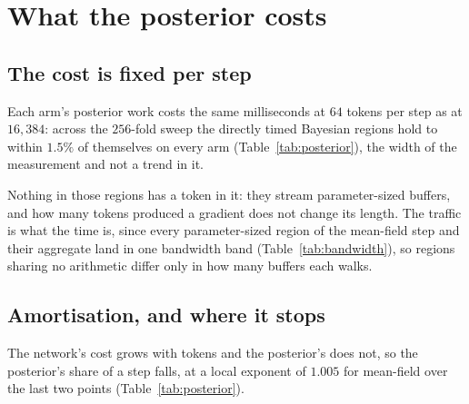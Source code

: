 \section{What the posterior costs}
\label{sec:cost}


\subsection{The cost is fixed per step}
\label{sec:cost:flat}

Each arm's posterior work costs the same milliseconds at $64$ tokens per step as at
$16{,}384$: across the $256$-fold sweep the directly timed Bayesian regions hold to
within $1.5\%$ of themselves on every arm (Table~\ref{tab:posterior}), the width of
the measurement and not a trend in it.

Nothing in those regions has a token in it: they stream parameter-sized buffers, and
how many tokens produced a gradient does not change its length. The traffic
is what the time is, since every parameter-sized region of the mean-field step and
their aggregate land in one bandwidth band (Table~\ref{tab:bandwidth}), so regions
sharing no arithmetic differ only in how many buffers each walks.

\begin{table}[t]
  \centering
  \resizebox{\linewidth}{!}{}
  \caption{Each arm's own Bayesian work, timed at the launch sites, unfused. Share is
  the posterior over the whole step, $k$ the exponent in $\text{share} \propto B^{-k}$
  between the two smallest and the two largest points measured.}
  \label{tab:posterior}
\end{table}

\subsection{Amortisation, and where it stops}
\label{sec:cost:amort}

The network's cost grows with tokens and the posterior's does not, so the
posterior's share of a step falls, at a local exponent of $1.005$ for mean-field
over the last two points (Table~\ref{tab:posterior}).

